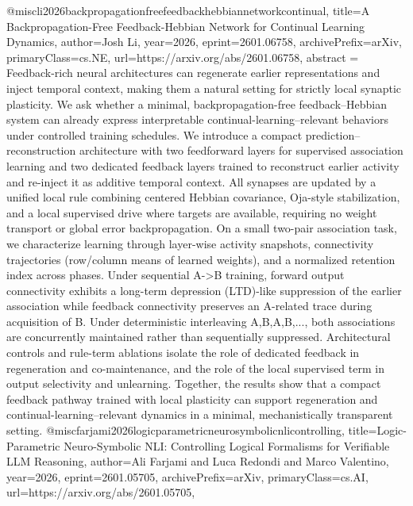 {}@misc{li2026backpropagationfreefeedbackhebbiannetworkcontinual,
      title={A Backpropagation-Free Feedback-Hebbian Network for Continual Learning Dynamics}, 
      author={Josh Li},
      year={2026},
      eprint={2601.06758},
      archivePrefix={arXiv},
      primaryClass={cs.NE},
      url={https://arxiv.org/abs/2601.06758},
      abstract = {Feedback-rich neural architectures can regenerate earlier representations and inject temporal context, making them a natural setting for strictly local synaptic plasticity. We ask whether a minimal, backpropagation-free feedback--Hebbian system can already express interpretable continual-learning--relevant behaviors under controlled training schedules. We introduce a compact prediction--reconstruction architecture with two feedforward layers for supervised association learning and two dedicated feedback layers trained to reconstruct earlier activity and re-inject it as additive temporal context. All synapses are updated by a unified local rule combining centered Hebbian covariance, Oja-style stabilization, and a local supervised drive where targets are available, requiring no weight transport or global error backpropagation. On a small two-pair association task, we characterize learning through layer-wise activity snapshots, connectivity trajectories (row/column means of learned weights), and a normalized retention index across phases. Under sequential A->B training, forward output connectivity exhibits a long-term depression (LTD)-like suppression of the earlier association while feedback connectivity preserves an A-related trace during acquisition of B. Under deterministic interleaving A,B,A,B,..., both associations are concurrently maintained rather than sequentially suppressed. Architectural controls and rule-term ablations isolate the role of dedicated feedback in regeneration and co-maintenance, and the role of the local supervised term in output selectivity and unlearning. Together, the results show that a compact feedback pathway trained with local plasticity can support regeneration and continual-learning--relevant dynamics in a minimal, mechanistically transparent setting.}
}@misc{farjami2026logicparametricneurosymbolicnlicontrolling,
      title={Logic-Parametric Neuro-Symbolic NLI: Controlling Logical Formalisms for Verifiable LLM Reasoning}, 
      author={Ali Farjami and Luca Redondi and Marco Valentino},
      year={2026},
      eprint={2601.05705},
      archivePrefix={arXiv},
      primaryClass={cs.AI},
      url={https://arxiv.org/abs/2601.05705},
}
